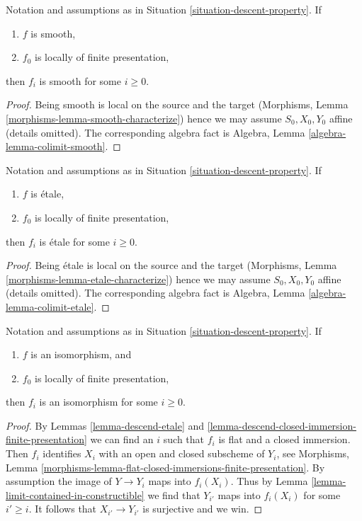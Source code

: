 \begin{lemma}
\label{lemma-descend-smooth}
Notation and assumptions as in Situation \ref{situation-descent-property}.
If
\begin{enumerate}
\item $f$ is smooth,
\item $f_0$ is locally of finite presentation,
\end{enumerate}
then $f_i$ is smooth for some $i \geq 0$.
\end{lemma}

\begin{proof}
Being smooth is local on the source and the target (Morphisms,
Lemma \ref{morphisms-lemma-smooth-characterize}) hence we may assume
$S_0, X_0, Y_0$ affine (details omitted). The corresponding algebra fact is
Algebra, Lemma \ref{algebra-lemma-colimit-smooth}.
\end{proof}

\begin{lemma}
\label{lemma-descend-etale}
Notation and assumptions as in Situation \ref{situation-descent-property}.
If
\begin{enumerate}
\item $f$ is \'etale,
\item $f_0$ is locally of finite presentation,
\end{enumerate}
then $f_i$ is \'etale for some $i \geq 0$.
\end{lemma}

\begin{proof}
Being \'etale is local on the source and the target (Morphisms,
Lemma \ref{morphisms-lemma-etale-characterize}) hence we may assume
$S_0, X_0, Y_0$ affine (details omitted). The corresponding algebra fact is
Algebra, Lemma \ref{algebra-lemma-colimit-etale}.
\end{proof}

\begin{lemma}
\label{lemma-descend-isomorphism}
Notation and assumptions as in Situation \ref{situation-descent-property}.
If
\begin{enumerate}
\item $f$ is an isomorphism, and
\item $f_0$ is locally of finite presentation,
\end{enumerate}
then $f_i$ is an isomorphism for some $i \geq 0$.
\end{lemma}

\begin{proof}
By Lemmas \ref{lemma-descend-etale} and
\ref{lemma-descend-closed-immersion-finite-presentation}
we can find an $i$ such that $f_i$ is flat and a closed immersion.
Then $f_i$ identifies $X_i$ with an open and closed subscheme of
$Y_i$, see Morphisms, Lemma
\ref{morphisms-lemma-flat-closed-immersions-finite-presentation}.
By assumption the image of $Y \to Y_i$ maps into $f_i(X_i)$.
Thus by Lemma \ref{lemma-limit-contained-in-constructible}
we find that $Y_{i'}$ maps into $f_i(X_i)$ for some $i' \geq i$.
It follows that $X_{i'} \to Y_{i'}$ is surjective and we win.
\end{proof}

